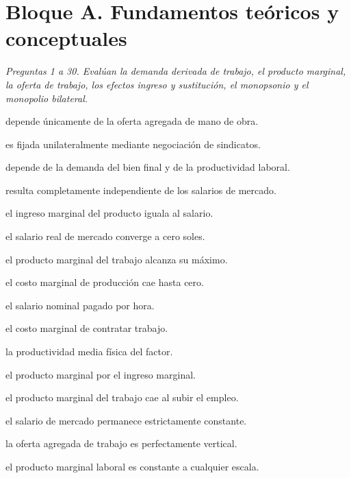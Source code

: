 \section*{Bloque A. Fundamentos teóricos y conceptuales}

\noindent\textit{Preguntas 1 a 30. Evalúan la demanda derivada de trabajo, el producto marginal, la oferta de trabajo, los efectos ingreso y sustitución, el monopsonio y el monopolio bilateral.}

\begin{opts}
    \item depende únicamente de la oferta agregada de mano de obra.
    \item es fijada unilateralmente mediante negociación de sindicatos.
    \item depende de la demanda del bien final y de la productividad laboral.
    \item resulta completamente independiente de los salarios de mercado.
\end{opts}

\begin{opts}
    \item el ingreso marginal del producto iguala al salario.
    \item el salario real de mercado converge a cero soles.
    \item el producto marginal del trabajo alcanza su máximo.
    \item el costo marginal de producción cae hasta cero.
\end{opts}

\begin{opts}
    \item el salario nominal pagado por hora.
    \item el costo marginal de contratar trabajo.
    \item la productividad media física del factor.
    \item el producto marginal por el ingreso marginal.
\end{opts}

\begin{opts}
    \item el producto marginal del trabajo cae al subir el empleo.
    \item el salario de mercado permanece estrictamente constante.
    \item la oferta agregada de trabajo es perfectamente vertical.
    \item el producto marginal laboral es constante a cualquier escala.
\end{opts}

